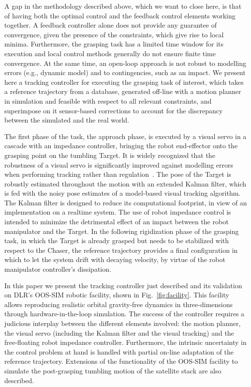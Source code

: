 A gap in the methodology described above, which we want to close here, is that of having both the optimal control and the feedback control elements working together. A feedback controller alone does not provide any guarantee of convergence, given the presence of the constraints, which give rise to local minima. Furthermore, the grasping task has a limited time window for its execution and local control methods generally do not ensure finite time convergence. At the same time, an open-loop approach is not robust to modelling errors (e.g., dynamic model) and to contingencies, such as an impact. We present here a tracking controller for executing the grasping task of interest, which takes a reference trajectory from a database, generated off-line with a motion planner in simulation and feasible with respect to all relevant constraints, and superimpose on it sensor-based corrections to account for the discrepancy between the simulated and the real world.

The first phase of the task, the approach phase, is executed by a visual servo in a cascade with an impedance controller, bringing the robot end-effector onto the grasping point on the tumbling Target. It is widely recognized that the robustness of a visual servo is significantly improved against modelling errors when performing tracking rather than regulation~\cite{siciliano2016springer}. The pose of the Target is robustly estimated throughout the motion with an extended Kalman filter, which is fed with the noisy pose estimates of a model-based visual tracking algorithm. The Kalman filter is designed to reduce its computational footprint, in view of an implementation on a realtime system. The use of robot impedance control is intended to minimize the detrimental effect of an impact between the robot manipulator and the Target. In the following rigidization phase of the grasping task, in which the Target is already grasped but needs to be stabilized with respect to the Chaser, the reference trajectory provides a final configuration in which to let the system drift with decaying velocity, by virtue of the robot manipulator controller's dissipation.

In this paper we present the tracking controller just described and its validation on DLR's OOS-SIM robotic facility, shown in Fig.~\ref{fig:facility}. This facility allows reproducing realistic orbital gravity-free dynamics in three-dimensions through hardware-in-the-loop simulation. The success of the controller requires a judicious interplay between the different elements involved: the motion planner, the visual servo (including the Kalman filter and the visual tracking) and the free-floating robot impedance controller. Furthermore, the intrinsic uncertainty in the control problem at hand is handled with partial on-line adaptation of the reference trajectory. Extensions of the functionality of the OOS-SIM facility to simulate the post-grasping tumbling motion of the satellite stack are also described.

